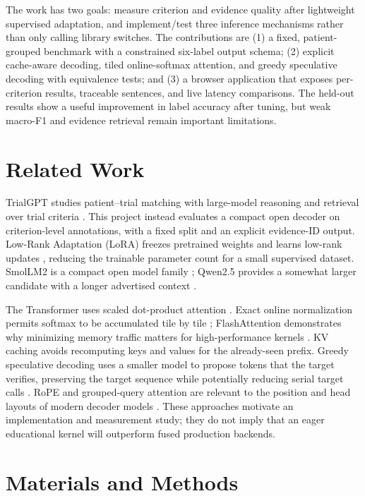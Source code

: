 \documentclass[conference]{IEEEtran}
\begin{document}
The work has two goals: measure criterion and evidence quality after lightweight
supervised adaptation, and implement/test three inference mechanisms rather than only
calling library switches. The contributions are (1) a fixed, patient-grouped benchmark
with a constrained six-label output schema; (2) explicit cache-aware decoding, tiled
online-softmax attention, and greedy speculative decoding with equivalence tests; and
(3) a browser application that exposes per-criterion results, traceable sentences, and
live latency comparisons. The held-out results show a useful improvement in label
accuracy after tuning, but weak macro-F1 and evidence retrieval remain important
limitations.

\section{Related Work}
TrialGPT studies patient--trial matching with large-model reasoning and retrieval over
trial criteria \cite{jin2024trialgpt}. This project instead evaluates a compact open
decoder on criterion-level annotations, with a fixed split and an explicit evidence-ID
output. Low-Rank Adaptation (LoRA) freezes pretrained weights and learns low-rank
updates \cite{hu2022lora}, reducing the trainable parameter count for a small supervised
dataset. SmolLM2 is a compact open model family \cite{allal2025smollm2}; Qwen2.5
provides a somewhat larger candidate with a longer advertised context
\cite{qwen2024qwen2}.

The Transformer uses scaled dot-product attention \cite{vaswani2017attention}. Exact
online normalization permits softmax to be accumulated tile by tile
\cite{milakov2018online}; FlashAttention demonstrates why minimizing memory traffic
matters for high-performance kernels \cite{dao2022flashattention}. KV caching avoids
recomputing keys and values for the already-seen prefix. Greedy speculative decoding
uses a smaller model to propose tokens that the target verifies, preserving the target
sequence while potentially reducing serial target calls
\cite{leviathan2023speculative,chen2023accelerating}. RoPE and grouped-query attention
are relevant to the position and head layouts of modern decoder models
\cite{su2021roformer,ainslie2023gqa}. These approaches motivate an implementation and
measurement study; they do not imply that an eager educational kernel will outperform
fused production backends.

\section{Materials and Methods}
\end{document}
